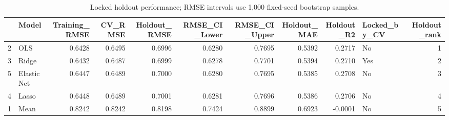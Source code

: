 \begin{table}

\caption{\label{tab:p5-holdout-performance}Locked holdout performance; RMSE intervals use 1,000 fixed-seed bootstrap samples.}
\centering
\begin{tabular}[t]{llrrrrrrrlr}
\toprule
  & Model & Training\_RMSE & CV\_RMSE & Holdout\_RMSE & RMSE\_CI\_Lower & RMSE\_CI\_Upper & Holdout\_MAE & Holdout\_R2 & Locked\_by\_CV & Holdout\_rank\\
\midrule
2 & OLS & 0.6428 & 0.6495 & 0.6996 & 0.6280 & 0.7695 & 0.5392 & 0.2717 & No & 1\\
3 & Ridge & 0.6432 & 0.6487 & 0.6999 & 0.6278 & 0.7701 & 0.5394 & 0.2710 & Yes & 2\\
5 & Elastic Net & 0.6447 & 0.6489 & 0.7000 & 0.6280 & 0.7695 & 0.5385 & 0.2708 & No & 3\\
4 & Lasso & 0.6448 & 0.6489 & 0.7001 & 0.6281 & 0.7696 & 0.5386 & 0.2706 & No & 4\\
1 & Mean & 0.8242 & 0.8242 & 0.8198 & 0.7424 & 0.8899 & 0.6923 & -0.0001 & No & 5\\
\bottomrule
\end{tabular}
\end{table}
